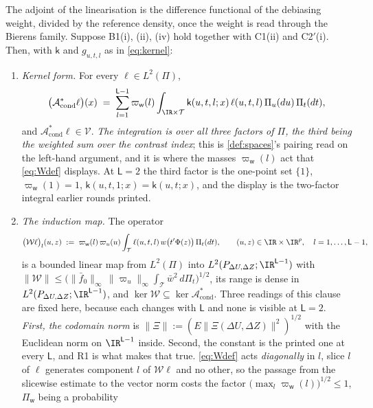 \begin{lemma}\label{lem:adjoint}
The adjoint of the linearisation is the difference functional of the debiasing weight, divided by the
reference density, once the weight is read through the Bierens family.
Suppose B1(i), (ii), (iv) hold together with C1(ii) and C2$'$(i). Then, with
$\mathsf k$ and $g_{u,t,l}$ as in \eqref{eq:kernel}:
\begin{enumerate}
\item[(i)] \emph{Kernel form.} For every $\ell\in L^{2}(\Pi)$,
\[
\big(\mathcal A^\ast_{\mathrm{cond}}\ell\big)(x)
\;=\;\sum_{l=1}^{\mathsf L-1}\varpi_{\mathsf w}(l)\int_{\IR\times\mathcal T}
\mathsf k(u,t,l;x)\,\ell(u,t,l)\,\Pi_u(du)\,\Pi_t(dt),
\]
and $\mathcal A^\ast_{\mathrm{cond}}\ell\in\mathcal V$. \emph{The integration is over all three factors
of $\Pi$, the third being the weighted sum over the contrast index}; this is \cref{def:spaces}'s pairing
read on the left-hand argument, and it is where the masses
$\varpi_{\mathsf w}(l)$ act that \eqref{eq:Wdef} displays. At $\mathsf L=2$ the third factor is the
one-point set $\{1\}$, $\varpi_{\mathsf w}(1)=1$, $\mathsf k(u,t,1;x)=\mathsf k(u,t;x)$, and the display
is the two-factor integral earlier rounds printed.
\item[(ii)] \emph{The induction map.} The operator
\begin{equation}\label{eq:Wdef}
\big(\mathcal W\ell\big)_l(u,z)\;:=\;\varpi_{\mathsf w}(l)\,\varpi_u(u)\int_{\mathcal T}\ell(u,t,l)\,
w\big(t'\Phi(z)\big)\,\Pi_t(dt),
\qquad (u,z)\in\IR\times\IR^{p},\quad l=1,\dots,\mathsf L-1,
\end{equation}
is a bounded linear map from $L^{2}(\Pi)$ into $L^{2}(P_{\Delta U,\Delta Z};\IR^{\mathsf L-1})$ with
$\|\mathcal W\|\le\big(\|\bar f_0\|_\infty\,\|\varpi_u\|_\infty\int_{\mathcal T}\bar w^{2}\,d\Pi_t\big)^{1/2}$,
its range is dense in $L^{2}(P_{\Delta U,\Delta Z};\IR^{\mathsf L-1})$, and
$\ker\mathcal W\subseteq\ker\mathcal A^\ast_{\mathrm{cond}}$.
Three readings of this clause are fixed here, because each changes with $\mathsf L$ and none is
visible at $\mathsf L=2$. \emph{First, the codomain norm} is
$\|\Xi\|:=(E\|\Xi(\Delta U,\Delta Z)\|^{2})^{1/2}$ with the Euclidean norm on $\IR^{\mathsf L-1}$ inside.
Second, the constant is the printed one at every $\mathsf L$, and R1 is what makes that true.
\eqref{eq:Wdef} acts \emph{diagonally} in $l$, slice $l$ of $\ell$ generates component $l$ of
$\mathcal W\ell$ and no other, so the passage from the slicewise estimate to the vector norm costs
the factor $\big(\max_{l}\varpi_{\mathsf w}(l)\big)^{1/2}\le1$, $\Pi_{\mathsf w}$ being a probability

\end{enumerate}
\end{lemma}
